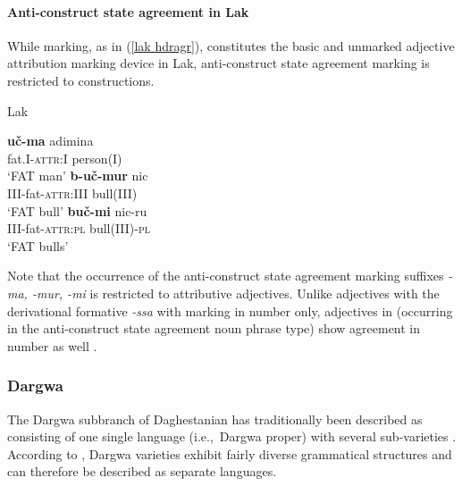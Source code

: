 \paragraph*{Anti\hyp{}construct state agreement in Lak}
While  marking, as in (\ref{lak hdragr}), constitutes the basic and unmarked adjective attribution marking device in Lak, anti\hyp{}construct state agreement marking is restricted to  constructions.
\begin{exe}
\ex 
\rm{Lak \citep[45]{zirkov1955}}%
\begin{xlist}
\ex
\gll	\textbf{uč-ma} adimina\\
	fat.\textsc{I}-\textsc{attr:I} person\textsc{(I)}\\
\glt	‘FAT man’
\ex
\gll	\textbf{b-uč-mur} nic\\
	\textsc{III}-fat-\textsc{attr:III} bull\textsc{(III)}\\
\glt	‘FAT bull’
\ex
\gll	\textbf{buč-mi} nic-ru\\
	\textsc{III}-fat-\textsc{attr:pl} bull\textsc{(III)}-\textsc{pl}\\
\glt	‘FAT bulls’
\end{xlist}
\end{exe}
Note that the occurrence of the anti\hyp{}construct state agreement marking suffixes \textit{-ma, -mur, -mi} is restricted to attributive adjectives. Unlike adjectives with the derivational formative \textit{-ssa} with  marking in number only, adjectives in  (occurring in the anti\hyp{}construct state agreement noun phrase type) show agreement in number as well \citep[45–51]{zirkov1955}.

\subsubsection{Dargwa}
The Dargwa subbranch of Daghestanian has traditionally been described as consisting of one single language (i.e.,~Dargwa proper) with several sub-varieties \cite[233]{salminen2007}. According to \textcite{korjakov2006a}, Dargwa varieties exhibit fairly diverse grammatical structures and can therefore be described as separate languages.

